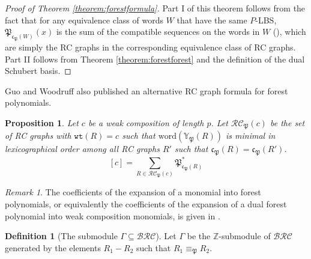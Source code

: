 \documentclass[a4paper,fleqn]{cas-sc}
\newtheorem{proposition}[lemma]{Proposition}
\theoremstyle{definition}
\newtheorem{definition}[lemma]{Definition}
\theoremstyle{remark}
\newtheorem*{remark}{Remark}
\numberwithin{equation}{subsection}
\newcommand{\wtt}{\mathtt{wt}}
\newcommand{\BRC}{\mathcal{BRC}}
\newcommand{\RC}{\mathcal{RC}}
\newcommand{\code}{\mathfrak{c}}
\newcommand{\forest}{\mathfrak{P}}
\begin{document}
\begin{proof}[Proof of Theorem \ref{theorem:forestformula}]
  Part I of this theorem follows from the fact that for any equivalence class of words $W$ that have the same $P$-LBS, $\forest_{\code_\forest(W)}(x)$ is the sum of the compatible sequences on the words in $W$ (\cite[Proposition~5.10]{nadeau2024forest}), which are simply the RC graphs in the corresponding equivalence class of RC graphs. Part II follows from Theorem \ref{theorem:forestforest} and the definition of the dual Schubert basis.
\end{proof}

Guo and Woodruff \cite{guo2026forest} also published an alternative RC graph formula for forest polynomials.


\begin{proposition}
Let $c$ be a weak composition of length $p$. Let $\RC_\forest(c)$ be the set of RC graphs with $\wtt(R) = c$ such that $\mathrm{word}(\mathbb{Y}_\forest(R))$ is minimal in lexicographical order among all RC graphs $R'$ such that $\code_\forest(R)=\code_\forest(R')$.
$$[c] = \sum_{R\in\RC_\forest(c)} \forest_{\code_\forest(R)}^*$$
\end{proposition}

\begin{remark}
The coefficients of the expansion of a monomial into forest polynomials, or equivalently the coefficients of the expansion of a dual forest polynomial into weak composition monomials, is given in \cite[Proposition~10.15]{nadeau2024forest}.
\end{remark}

\begin{definition}[The submodule $\Gamma\subseteq \BRC$]\label{definition:gamma}
  Let $\Gamma$ be the $\mathbb{Z}$-submodule of $\BRC$ generated by the elements $R_1-R_2$ such that $R_1\equiv_\forest R_2$.

\end{definition}
\end{document}
